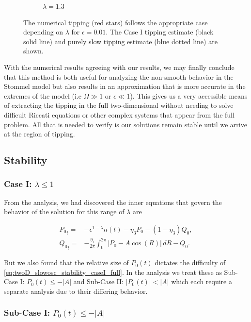 \begin{figure}[H]
\begin{subfigure}{.5\textwidth}
 \caption{$\lambda=1.3$}
\end{subfigure}
\caption{The numerical tipping (red stars) follows the appropriate case depending on $\lambda$ for $\epsilon=0.01$. The Case I tipping estimate (black solid line) and purely slow tipping estimate (blue dotted line) are shown.}
\label{fig:twoD_slowosc_epscomp}
\end{figure}

With the numerical results agreeing with our results, we may finally conclude that this method is both useful for analyzing the non-smooth behavior in the Stommel model but also results in an approximation that is more accurate in the extremes of the model (i.e $\Omega \gg 1$ or $\epsilon \ll 1$). This gives us a very accessible means of extracting the tipping in the full two-dimensional without needing to solve difficult Riccati equations or other complex systems that appear from the full problem. All that is needed to verify is our solutions remain stable until we arrive at the region of tipping.

\subsection{Stability}

\subsubsection{Case I: $\lambda\le 1$}

From the analysis, we had discovered the inner equations that govern the behavior of the solution for this range of $\lambda$ are

\begin{equation}\label{eq:twoD_slowosc_stability_caseI_full}
\begin{aligned}
{P_0}_t =& -\epsilon^{1-\lambda} n(t)-\eta_3 P_0 -(1-\eta_3)Q_0,\\
{Q_0}_t =& -\frac{\eta_1}{2\pi}\int_0^{2\pi}|P_0-A\cos(R)|\,dR - Q_0.
\end{aligned}
\end{equation}

But we also found that the relative size of $P_0(t)$ dictates the difficulty of \eqref{eq:twoD_slowosc_stability_caseI_full}. In the analysis we treat these as Sub-Case I: $P_0(t)\le-|A|$ and Sub-Case II: $|P_0(t)|<|A|$ which each require a separate analysis due to their differing behavior.

\subsubsection{Sub-Case I: $P_0(t)\le-|A|$}

